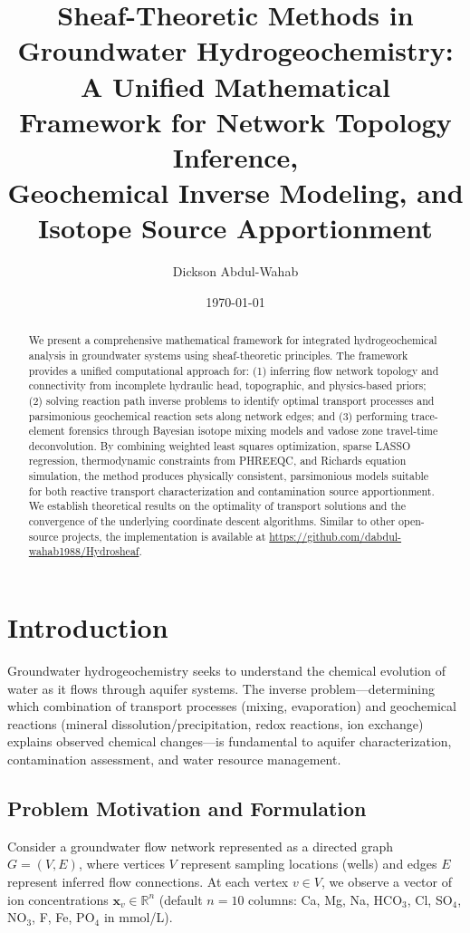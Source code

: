 \documentclass[12pt,a4paper]{article}
\title{Sheaf-Theoretic Methods in Groundwater Hydrogeochemistry: \\
A Unified Mathematical Framework for Network Topology Inference, \\ Geochemical Inverse Modeling, and Isotope Source Apportionment}
\author{Dickson Abdul-Wahab}
\date{\today}
\theoremstyle{plain}
\theoremstyle{definition}
\theoremstyle{remark}
\begin{document}
\maketitle

\begin{abstract}
	We present a comprehensive mathematical framework for integrated hydrogeochemical analysis in groundwater systems using sheaf-theoretic principles. The framework provides a unified computational approach for: (1) inferring flow network topology and connectivity from incomplete hydraulic head, topographic, and physics-based priors; (2) solving reaction path inverse problems to identify optimal transport processes and parsimonious geochemical reaction sets along network edges; and (3) performing trace-element forensics through Bayesian isotope mixing models and vadose zone travel-time deconvolution. By combining weighted least squares optimization, sparse LASSO regression, thermodynamic constraints from PHREEQC, and Richards equation simulation, the method produces physically consistent, parsimonious models suitable for both reactive transport characterization and contamination source apportionment. We establish theoretical results on the optimality of transport solutions and the convergence of the underlying coordinate descent algorithms. Similar to other open-source projects, the implementation is available at \url{https://github.com/dabdul-wahab1988/Hydrosheaf}.
\end{abstract}

\section{Introduction}\label{sec:intro}

Groundwater hydrogeochemistry seeks to understand the chemical evolution of water as it flows through aquifer systems. The inverse problem---determining which combination of transport processes (mixing, evaporation) and geochemical reactions (mineral dissolution/precipitation, redox reactions, ion exchange) explains observed chemical changes---is fundamental to aquifer characterization, contamination assessment, and water resource management.

\subsection{Problem Motivation and Formulation}

Consider a groundwater flow network represented as a directed graph $G = (V, E)$, where vertices $V$ represent sampling locations (wells) and edges $E$ represent inferred flow connections. At each vertex $v \in V$, we observe a vector of ion concentrations $\mathbf{x}_v \in \mathbb{R}^n$ (default $n=10$ columns: Ca, Mg, Na, HCO$_3$, Cl, SO$_4$, NO$_3$, F, Fe, PO$_4$ in mmol/L).
\end{document}
